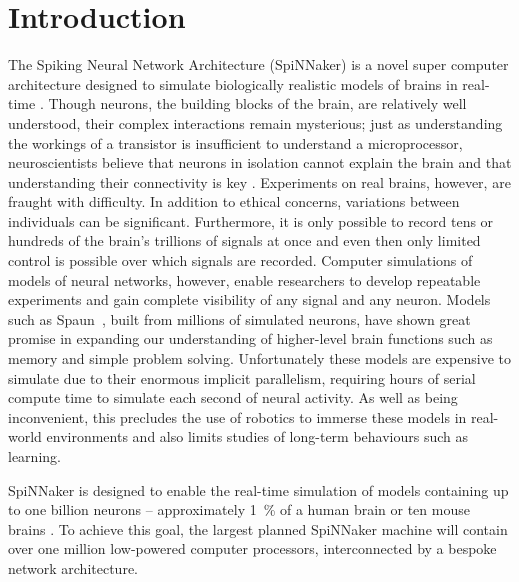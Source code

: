 \chapter{Introduction}

\label{sec:introduction}

%

The Spiking Neural Network Architecture (SpiNNaker) is a novel super computer
architecture designed to simulate biologically realistic models of brains in
real-time \cite{furber07}. Though neurons, the building blocks of the brain,
are relatively well understood, their complex interactions remain mysterious;
just as understanding the workings of a transistor is insufficient to
understand a microprocessor, neuroscientists believe that neurons in isolation
cannot explain the brain and that understanding their connectivity is key
\cite{eliasmith13,eliasmith14}. Experiments on real brains, however, are
fraught with difficulty. In addition to ethical concerns, variations between
individuals can be significant. Furthermore, it is only possible to record tens
or hundreds of the brain's trillions of signals at once and even then only
limited control is possible over which signals are recorded. Computer
simulations of models of neural networks, however, enable researchers to
develop repeatable experiments and gain complete visibility of any signal and
any neuron. Models such as Spaun~\cite{eliasmith12}, built from millions of
simulated neurons, have shown great promise in expanding our understanding of
higher-level brain functions such as memory and simple problem solving.
Unfortunately these models are expensive to simulate due to their enormous
implicit parallelism, requiring hours of serial compute time to simulate each
second of neural activity. As well as being inconvenient, this precludes the
use of robotics to immerse these models in real-world environments and also
limits studies of long-term behaviours such as learning.

SpiNNaker is designed to enable the real-time simulation of models containing
up to one billion neurons -- approximately \SI{1}{\percent} of a human brain or
ten mouse brains \cite{furber06}. To achieve this goal, the largest planned
SpiNNaker machine will contain over one million low-powered computer
processors, interconnected by a bespoke network architecture.

